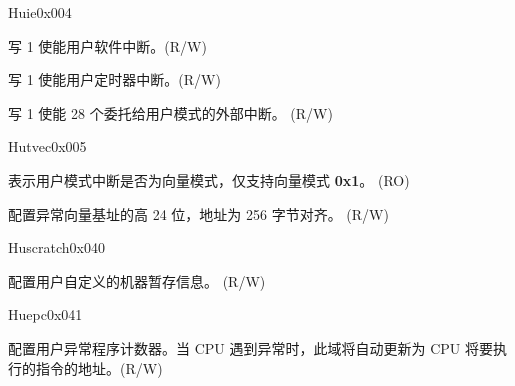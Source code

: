 \begin{register}{H}{uie}{0x004}\label{regdesc:UIE}
%
%
%
%
%
%
%
\regnewline%
\begin{regdesc}\begin{reglist}
\label{fielddesc:UIEUSIE}\item [USIE] 写 1 使能用户软件中断。(R/W)
\label{fielddesc:UIEUTIE}\item [UTIE] 写 1 使能用户定时器中断。(R/W)
\label{fielddesc:UIEUXIE}\item [UXIE] 写 1 使能 28 个委托给用户模式的外部中断。 (R/W)
\end{reglist}\end{regdesc}
\end{register}

\begin{register}{H}{utvec}{0x005}\label{regdesc:UTVEC}
%
%
%
\regnewline%
\begin{regdesc}\begin{reglist}
\label{fielddesc:UTVECMODE}\item [MODE] 表示用户模式中断是否为向量模式，仅支持向量模式 \textbf{0x1}。 (RO)
\label{fielddesc:UTVECBASE}\item [BASE] 配置异常向量基址的高 24 位，地址为 256 字节对齐。 (R/W)
\end{reglist}\end{regdesc}
\end{register}

\begin{register}{H}{uscratch}{0x040}\label{regdesc:USCRATCH}
%
\regnewline%
\begin{regdesc}\begin{reglist}
\label{fielddesc:USCRATCH}\item [USCRATCH] 配置用户自定义的机器暂存信息。 (R/W)
\end{reglist}\end{regdesc}
\end{register}

\begin{register}{H}{uepc}{0x041}\label{regdesc:UEPC}
%
\regnewline%
\begin{regdesc}\begin{reglist}
\label{fielddesc:UEPC}\item [UEPC] 配置用户异常程序计数器。当 CPU 遇到异常时，此域将自动更新为 CPU 将要执行的指令的地址。(R/W)
\end{reglist}\end{regdesc}
\end{register}

